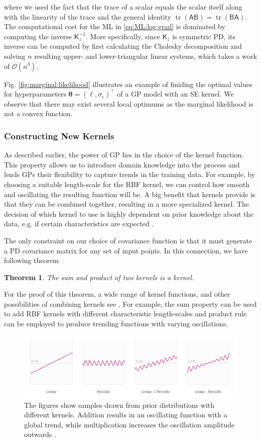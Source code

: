 \documentclass[10pt]{article}
\newtheorem{thm}{Theorem}[section]
\theoremstyle{definition}
\DeclareMathOperator{\tr}{tr}
\begin{document}
where we used the fact that the trace of a scalar equals the scalar itself along with the linearity of the trace and the general identity $\tr(\mathsf{A}\mathsf{B})=\tr(\mathsf{B}\mathsf{A})$. The computational cost for the ML in \eqref{eq:ML:log:grad} is dominated by computing the inverse $\mathsf{K}_z^{-1}$. More specifically, since $\mathsf{K}_z$ is symmetric PD, its inverse can be computed by first calculating the Cholesky decomposition and solving $n$ resulting upper- and lower-triangular linear systems, which takes a work of $\mathcal{O}(n^3)$.

Fig. \ref{fig:marginal:likelihood} illustrates an example of finiding the optimal values for hyperparameters $\boldsymbol{\theta}=(\ell, \sigma_{\epsilon})^{\top}$ of a GP model with an SE kernel. We observe that there may exist several local optimums as the marginal likelihood is not a convex function.

\subsubsection{Constructing New Kernels}
As described earlier, the power of GP lies in the choice of the kernel function. This property allows us to introduce domain knowledge into the process and lends GPs their flexibility to capture trends in the training data. For example, by choosing a suitable length-scale for the RBF kernel, we can control how smooth and oscillating the resulting function will be. A big benefit that kernels provide is that they can be combined together, resulting in a more specialized kernel. The decision of which kernel to use is highly dependent on prior knowledge about the data, e.g. if certain characteristics are expected \cite{Gortler2019}.

The only constraint on our choice of covariance function is that it must generate a PD covariance matrix for any set of input points. In this connection, we have following theorem
\begin{thm}
The sum and product of two kernels is a kernel.
\end{thm}
For the proof of this theorem, a wide range of kernel functions, and other possibilities of combining kernels see \cite[Section 4.2]{Rasmussen2006}. For example, the sum property can be used to add RBF kernels with different characteristic length-scales and product rule can be employed to produce trending functions with varying oscillations.
\begin{figure}[t!]
\centering
\includegraphics[width=17cm]{figs/combine-kernels.png}
\caption{The figures show samples drawn from prior distributions with different kernels. Addition results in an oscillating function with a global trend, while multiplication increases the oscillation amplitude outwards \cite{Gortler2019}.}
\label{fig:kernels:combine}
\end{figure}
\end{document}
